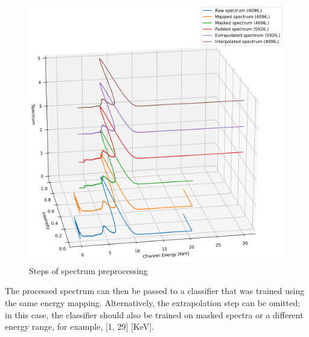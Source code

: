 \begin{figure}[H] 
  \centering     
  \includegraphics[width=1\textwidth]{img/spectrum_preprocessing.png} 
  \caption{Steps of spectrum preprocessing}
  \label{fig:spectrum_preprocessing}
\end{figure}

The processed spectrum can then be passed to a classifier that was trained using the same energy mapping. 
Alternatively, the extrapolation step can be omitted; in this case, the classifier should also be trained on masked spectra or a different energy range, for example, [1, 29] [KeV].